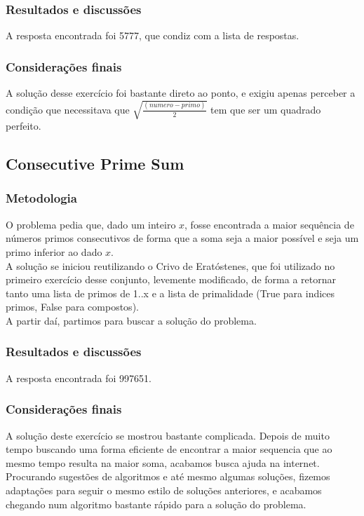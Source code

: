 \documentclass{article}
\begin{document}
        \subsubsection{Resultados e discussões}
        A resposta encontrada foi 5777, que condiz com a lista de respostas.
        
        \subsubsection{Considerações finais}
        A solução desse exercício foi bastante direto ao ponto, e exigiu apenas perceber a condição que necessitava que $\sqrt{\frac{(numero - primo)}{2}}$ tem que ser um quadrado perfeito.
        
    \subsection{Consecutive Prime Sum}
        
        \subsubsection{Metodologia}
        O problema pedia que, dado um inteiro $x$, fosse encontrada a maior sequência de números primos consecutivos de forma que a soma seja a maior possível e seja um primo inferior ao dado $x$.\\
        A solução se iniciou reutilizando o Crivo de Eratóstenes, que foi utilizado no primeiro exercício desse conjunto, levemente modificado, de forma a retornar tanto uma lista de primos de 1..x e a lista de primalidade (True para indices primos, False para compostos).\\
        A partir daí, partimos para buscar a solução do problema.
        
        \subsubsection{Resultados e discussões}
        A resposta encontrada foi 997651.
        
        \subsubsection{Considerações finais}
        A solução deste exercício se mostrou bastante complicada. Depois de muito tempo buscando uma forma eficiente de encontrar a maior sequencia que ao mesmo tempo resulta na maior soma, acabamos busca ajuda na internet.\\
        Procurando sugestões de algoritmos e até mesmo algumas soluções, fizemos adaptações para seguir o mesmo estilo de soluções anteriores, e acabamos chegando num algoritmo bastante rápido para a solução do problema.
\clearpage
\end{document}
